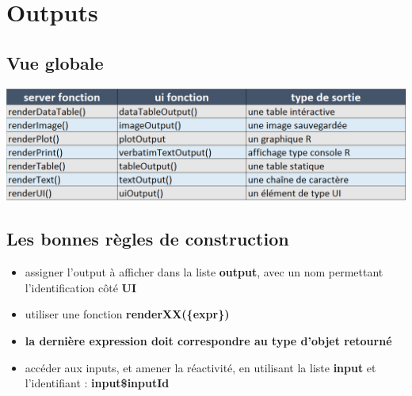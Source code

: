 \documentclass[
]{article}
\newenvironment{Shaded}{\begin{snugshade}}{\end{snugshade}}
\newcommand{\AttributeTok}[1]{\textcolor[rgb]{0.13,0.29,0.53}{#1}}
\newcommand{\CommentTok}[1]{\textcolor[rgb]{0.56,0.35,0.01}{\textit{#1}}}
\newcommand{\DecValTok}[1]{\textcolor[rgb]{0.00,0.00,0.81}{#1}}
\newcommand{\FunctionTok}[1]{\textcolor[rgb]{0.13,0.29,0.53}{\textbf{#1}}}
\newcommand{\NormalTok}[1]{#1}
\newcommand{\OtherTok}[1]{\textcolor[rgb]{0.56,0.35,0.01}{#1}}
\newcommand{\SpecialCharTok}[1]{\textcolor[rgb]{0.81,0.36,0.00}{\textbf{#1}}}
\newcommand{\StringTok}[1]{\textcolor[rgb]{0.31,0.60,0.02}{#1}}
\providecommand{\tightlist}{%
  \setlength{\itemsep}{0pt}\setlength{\parskip}{0pt}}
\begin{document}
\hypertarget{outputs}{%
\section{Outputs}\label{outputs}}

\hypertarget{vue-globale-1}{%
\subsection{Vue globale}\label{vue-globale-1}}

\includegraphics{img/all_output.png}

\hypertarget{les-bonnes-ruxe8gles-de-construction}{%
\subsection{Les bonnes règles de
construction}\label{les-bonnes-ruxe8gles-de-construction}}

\begin{itemize}
\tightlist
\item
  assigner l'output à afficher dans la liste \textbf{output}, avec un
  nom permettant l'identification côté \textbf{UI}
\item
  utiliser une fonction \textbf{renderXX(\{expr\})}
\item
  \textbf{la dernière expression doit correspondre au type d'objet
  retourné}
\item
  accéder aux inputs, et amener la réactivité, en utilisant la liste
  \textbf{input} et l'identifiant : \textbf{input\$inputId}
\end{itemize}

\begin{Shaded}
\end{Shaded}
\end{document}
